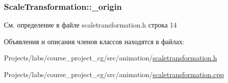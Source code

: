 \subsubsection[{\texorpdfstring{\+\_\+origin}{_origin}}]{ Scale\+Transformation\+::\+\_\+origin\hspace{0.3cm}{\ttfamily [protected]}}\hypertarget{class_scale_transformation_ad2053c743ab2b0d87149c24540aadaaa}{}\label{class_scale_transformation_ad2053c743ab2b0d87149c24540aadaaa}


См. определение в файле scaletransformation.\+h строка 14



Объявления и описания членов классов находятся в файлах\+:\begin{DoxyCompactItemize}
\item 
Projects/labs/course\+\_\+project\+\_\+cg/src/animation/\hyperlink{scaletransformation_8h}{scaletransformation.\+h}\item 
Projects/labs/course\+\_\+project\+\_\+cg/src/animation/\hyperlink{scaletransformation_8cpp}{scaletransformation.\+cpp}\end{DoxyCompactItemize}
